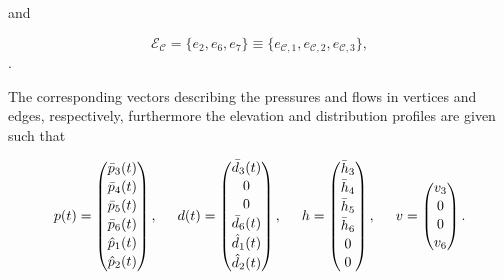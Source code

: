 and

\begin{equation}
\label{edgeorientation_example1_C}
  \mathcal{E}_\mathcal{C} = \{e_2, e_6, e_7\} \equiv \{e_{\mathcal{C},1}, e_{\mathcal{C},2}, e_{\mathcal{C},3}\},
\end{equation}.

The corresponding vectors describing the pressures and flows in vertices and edges, respectively, furthermore the elevation and distribution profiles are given such that

\begin{equation}
\label{example1_signals_constants}
p(t) =
 \begin{pmatrix} 
 \bar{p}_3(t) \\[1.3pt] 
 \bar{p}_4(t) \\[1.3pt]
 \bar{p}_5(t) \\[1.3pt] 
 \bar{p}_6(t) \\[1.3pt] 
 \hat{p}_1(t) \\[1.3pt] 
 \hat{p}_2(t) \\[1.3pt] 
 \end{pmatrix}
 , \hspace{5mm}
 d(t) =  \begin{pmatrix} 
 \bar{d}_3(t) \\[1pt] 
 0 \\[1pt]
 0 \\[1pt] 
 \bar{d}_6(t) \\[1pt] 
 \hat{d}_1(t) \\[1pt] 
 \hat{d}_2(t) \\[1pt] 
 \end{pmatrix}
 , \hspace{5mm}
 h =  \begin{pmatrix} 
 \bar{h}_3 \\[1pt] 
 \bar{h}_4 \\[1pt]
 \bar{h}_5 \\[1pt] 
 \bar{h}_6 \\[1pt] 
 0 \\[1pt] 
 0 \\[1pt] 
 \end{pmatrix}
 , \hspace{5mm}
 v =  \begin{pmatrix} 
 v_3 \\[1pt] 
 0 \\[1pt]
 0 \\[1pt] 
 v_6 \\[1pt]
 \end{pmatrix}.
\end{equation}

